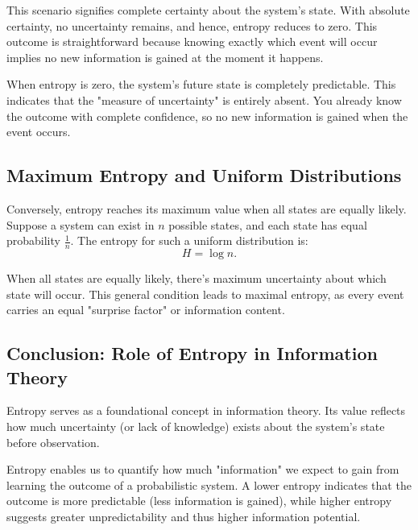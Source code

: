 \documentclass[12pt,a4paper]{article}
\newenvironment{rembox}[1][]{%
  \begin{tcolorbox}[enhanced, breakable, colback=gray!5, colframe=gray!50, title=#1, fonttitle=\bfseries, arc=3pt, boxrule=0.5pt]
}{\end{tcolorbox}}
\begin{document}
This scenario signifies complete certainty about the system's state. With absolute certainty, no uncertainty remains, and hence, entropy reduces to zero. This outcome is straightforward because knowing exactly which event will occur implies no new information is gained at the moment it happens.

\begin{rembox}[Interpretation of Zero Entropy]
When entropy is zero, the system's future state is completely predictable. This indicates that the "measure of uncertainty" is entirely absent. You already know the outcome with complete confidence, so no new information is gained when the event occurs.
\end{rembox}

\subsection{Maximum Entropy and Uniform Distributions}

Conversely, entropy reaches its maximum value when all states are equally likely. Suppose a system can exist in $n$ possible states, and each state has equal probability $\frac{1}{n}$. The entropy for such a uniform distribution is:
\[
H = \log n.
\]

\begin{rembox}[High Entropy = Maximal Uncertainty]
When all states are equally likely, there's maximum uncertainty about which state will occur. This general condition leads to maximal entropy, as every event carries an equal "surprise factor" or information content.
\end{rembox}

\subsection{Conclusion: Role of Entropy in Information Theory}

Entropy serves as a foundational concept in information theory. Its value reflects how much uncertainty (or lack of knowledge) exists about the system’s state before observation.

\begin{rembox}[Final Insight]
Entropy enables us to quantify how much "information" we expect to gain from learning the outcome of a probabilistic system. A lower entropy indicates that the outcome is more predictable (less information is gained), while higher entropy suggests greater unpredictability and thus higher information potential.
\end{rembox}
\end{document}

